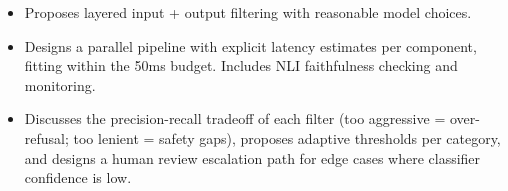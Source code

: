 \begin{interviewq}

\goodgreat
\begin{itemize}
    \item {} Proposes layered input + output filtering with reasonable model choices.
    \item {} Designs a parallel pipeline with explicit latency estimates per component, fitting within the 50ms budget. Includes NLI faithfulness checking and monitoring.
    \item {} Discusses the precision-recall tradeoff of each filter (too aggressive = over-refusal; too lenient = safety gaps), proposes adaptive thresholds per category, and designs a human review escalation path for edge cases where classifier confidence is low.
\end{itemize}

\end{interviewq}



